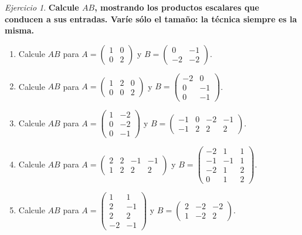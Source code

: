\documentclass[12pt]{article}
\theoremstyle{remark}
\newtheorem{Ejer}[definicion]{Ejercicio}
\begin{document}
\begin{Ejer}

\textbf{Calcule $AB$, mostrando los productos escalares que conducen a sus entradas. Varíe sólo el tamaño: la técnica siempre es la misma.}
\begin{enumerate}[resume=banco]

\item Calcule $AB$ para $A=\begin{pmatrix}1&0\\0&2\end{pmatrix}$ y $B=\begin{pmatrix}0&-1\\-2&-2\end{pmatrix}$.

\item Calcule $AB$ para $A=\begin{pmatrix}1&2&0\\0&0&2\end{pmatrix}$ y $B=\begin{pmatrix}-2&0\\0&-1\\0&-1\end{pmatrix}$.

\item Calcule $AB$ para $A=\begin{pmatrix}1&-2\\0&-2\\0&-1\end{pmatrix}$ y $B=\begin{pmatrix}-1&0&-2&-1\\-1&2&2&2\end{pmatrix}$.

\item Calcule $AB$ para $A=\begin{pmatrix}2&2&-1&-1\\1&2&2&2\end{pmatrix}$ y $B=\begin{pmatrix}-2&1&1\\-1&-1&1\\-2&1&2\\0&1&2\end{pmatrix}$.

\item Calcule $AB$ para $A=\begin{pmatrix}1&1\\2&-1\\2&2\\-2&-1\end{pmatrix}$ y $B=\begin{pmatrix}2&-2&-2\\1&-2&2\end{pmatrix}$.


\end{enumerate}
\end{Ejer}
\end{document}
